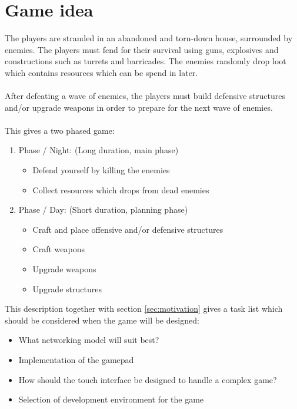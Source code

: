 \section{Game idea}
The players are stranded in an abandoned and torn-down house, surrounded by enemies. The players must fend for their survival using guns, explosives and constructions such as turrets and barricades. The enemies randomly drop loot which contains resources which can be spend in later.\\\\
After defeating a wave of enemies, the players must build defensive structures and/or upgrade weapons in order to prepare for the next wave of enemies.\\\\
This gives a two phased game:
\begin{enumerate}
\item Phase / Night: (Long duration, main phase)

\begin{itemize}
\item Defend yourself by killing the enemies
\item Collect resources which drops from dead enemies
\end{itemize}

\item Phase / Day: (Short duration, planning phase)

\begin{itemize}
\item Craft and place offensive and/or defensive structures
\item Craft weapons
\item Upgrade weapons 
\item Upgrade structures 

\end{itemize}	
\end{enumerate}
This description together with section \ref{sec:motivation} gives a task list which should be considered when the game will be designed:
\begin{itemize}
\item What networking model will suit best?
\item Implementation of the gamepad
\item How should the touch interface be designed to handle a complex game? 
\item Selection of development environment for the game
\end{itemize}
